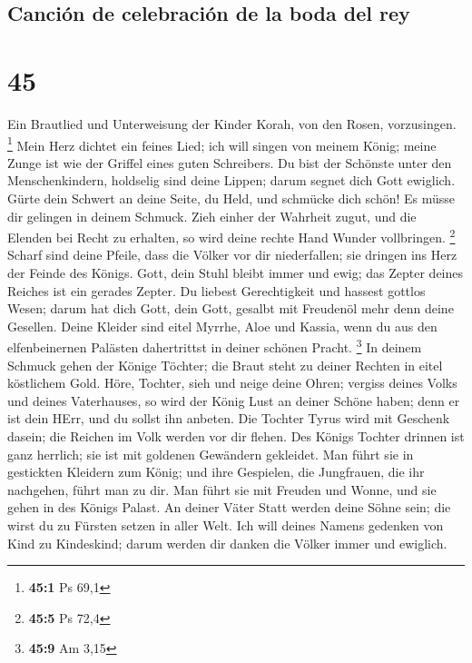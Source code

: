 \hypertarget{canciuxf3n-de-celebraciuxf3n-de-la-boda-del-rey}{%
\subsection{Canción de celebración de la boda del
rey}\label{canciuxf3n-de-celebraciuxf3n-de-la-boda-del-rey}}

\hypertarget{section-44}{%
\section{45}\label{section-44}}

 Ein Brautlied und Unterweisung der Kinder Korah, von den
Rosen, vorzusingen. \footnote{\textbf{45:1} Ps 69,1}  Mein
Herz dichtet ein feines Lied; ich will singen von meinem König; meine
Zunge ist wie der Griffel eines guten Schreibers.  Du bist
der Schönste unter den Menschenkindern, holdselig sind deine Lippen;
darum segnet dich Gott ewiglich.  Gürte dein Schwert an
deine Seite, du Held, und schmücke dich schön!  Es müsse
dir gelingen in deinem Schmuck. Zieh einher der Wahrheit zugut, und die
Elenden bei Recht zu erhalten, so wird deine rechte Hand Wunder
vollbringen. \footnote{\textbf{45:5} Ps 72,4}  Scharf sind
deine Pfeile, dass die Völker vor dir niederfallen; sie dringen ins Herz
der Feinde des Königs.  Gott, dein Stuhl bleibt immer und
ewig; das Zepter deines Reiches ist ein gerades Zepter. 
Du liebest Gerechtigkeit und hassest gottlos Wesen; darum hat dich Gott,
dein Gott, gesalbt mit Freudenöl mehr denn deine Gesellen.
 Deine Kleider sind eitel Myrrhe, Aloe und Kassia, wenn du
aus den elfenbeinernen Palästen dahertrittst in deiner schönen Pracht.
\footnote{\textbf{45:9} Am 3,15}  In deinem Schmuck gehen
der Könige Töchter; die Braut steht zu deiner Rechten in eitel
köstlichem Gold.  Höre, Tochter, sieh und neige deine
Ohren; vergiss deines Volks und deines Vaterhauses,  so
wird der König Lust an deiner Schöne haben; denn er ist dein HErr, und
du sollst ihn anbeten.  Die Tochter Tyrus wird mit
Geschenk dasein; die Reichen im Volk werden vor dir flehen.
 Des Königs Tochter drinnen ist ganz herrlich; sie ist
mit goldenen Gewändern gekleidet.  Man führt sie in
gestickten Kleidern zum König; und ihre Gespielen, die Jungfrauen, die
ihr nachgehen, führt man zu dir.  Man führt sie mit
Freuden und Wonne, und sie gehen in des Königs Palast. 
An deiner Väter Statt werden deine Söhne sein; die wirst du zu Fürsten
setzen in aller Welt.  Ich will deines Namens gedenken
von Kind zu Kindeskind; darum werden dir danken die Völker immer und
ewiglich.


